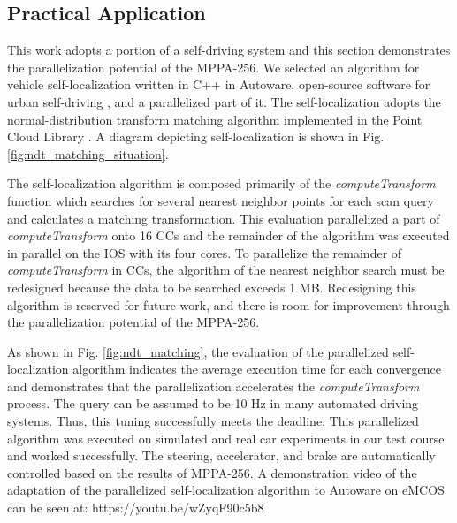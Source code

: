   \subsection{Practical Application}
  \label{sec:practical_application}
  This work adopts a portion of a self-driving system and this section demonstrates the parallelization potential of the MPPA-256.
  We selected an algorithm for vehicle self-localization written in C++ in Autoware, open-source software for urban self-driving \cite{autoware}, and a parallelized part of it.
  The self-localization adopts the normal-distribution transform matching algorithm \cite{magnusson2009three} implemented in the Point Cloud Library \cite{pcl}.
  A diagram depicting self-localization is shown in Fig. \ref{fig:ndt_matching_situation}.
  
  
  The self-localization algorithm is composed primarily of the \emph{computeTransform} function which searches for several nearest neighbor points for each scan query and calculates a matching transformation.
  This evaluation parallelized a part of \emph{computeTransform} onto 16 CCs and the remainder of the algorithm was executed in parallel on the IOS with its four cores.
  To parallelize the remainder of \emph{computeTransform} in CCs, the algorithm of the nearest neighbor search must be redesigned because the data to be searched exceeds 1 MB.
  Redesigning this algorithm is reserved for future work, and there is room for improvement through the parallelization potential of the MPPA-256.
  
  As shown in Fig. \ref{fig:ndt_matching}, the evaluation of the parallelized self-localization algorithm indicates the average execution time for each convergence and demonstrates that the parallelization accelerates the \emph{computeTransform} process.
  The query can be assumed to be 10 Hz in many automated driving systems.
  Thus, this tuning successfully meets the deadline.
  This parallelized algorithm was executed on simulated and real car experiments in our test course and worked successfully.
  The steering, accelerator, and brake are automatically controlled based on the results of MPPA-256.
  A demonstration video of the adaptation of the parallelized self-localization algorithm to Autoware on eMCOS can be seen at: https://youtu.be/wZyqF90c5b8  
  
